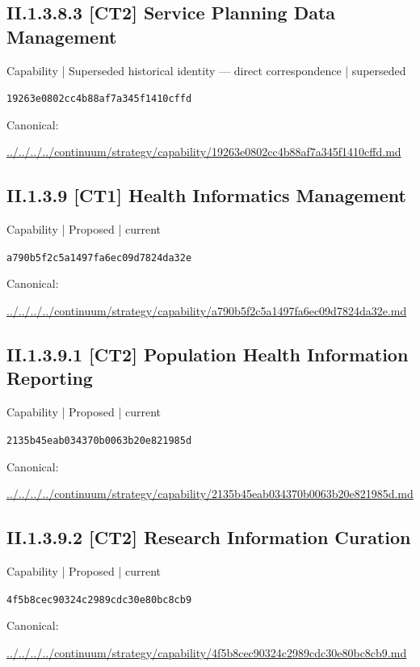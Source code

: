 \documentclass[10pt,a4paper]{article}
\begin{document}
\subsection*{II.1.3.8.3 [CT2] Service Planning Data Management}
{\small Capability | Superseded historical identity — direct correspondence | superseded}\par
\texttt{19263e0802cc4b88af7a345f1410cffd}\par
Canonical: \par
{\footnotesize\url{../../../../continuum/strategy/capability/19263e0802cc4b88af7a345f1410cffd.md}}\par
\subsection*{II.1.3.9 [CT1] Health Informatics Management}
{\small Capability | Proposed | current}\par
\texttt{a790b5f2c5a1497fa6ec09d7824da32e}\par
Canonical: \par
{\footnotesize\url{../../../../continuum/strategy/capability/a790b5f2c5a1497fa6ec09d7824da32e.md}}\par
\subsection*{II.1.3.9.1 [CT2] Population Health Information Reporting}
{\small Capability | Proposed | current}\par
\texttt{2135b45eab034370b0063b20e821985d}\par
Canonical: \par
{\footnotesize\url{../../../../continuum/strategy/capability/2135b45eab034370b0063b20e821985d.md}}\par
\subsection*{II.1.3.9.2 [CT2] Research Information Curation}
{\small Capability | Proposed | current}\par
\texttt{4f5b8cec90324c2989cdc30e80bc8cb9}\par
Canonical: \par
{\footnotesize\url{../../../../continuum/strategy/capability/4f5b8cec90324c2989cdc30e80bc8cb9.md}}\par
\end{document}
